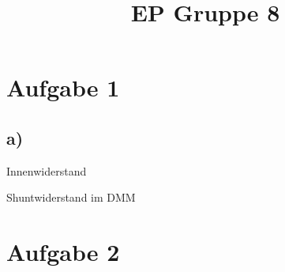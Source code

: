 \documentclass[compress,11pt]{beamer}
\title{EP Gruppe 8}
\begin{document}
\frame[c]{\titlepage}
\begin{frame}
\tableofcontents
\end{frame}

\section{Aufgabe 1}
\subsection{a)}
\begin{frame}{Innenwiderstand}
\begin{block}{Shuntwiderstand im DMM}
\end{block}
\end{frame}
\section{Aufgabe 2}
\end{document}
